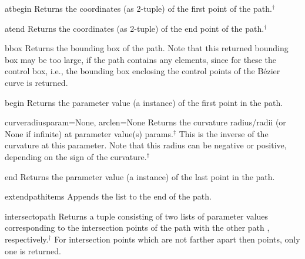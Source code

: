 \begin{methoddesc}{atbegin}{}
  Returns the coordinates (as 2-tuple) of the first point of the path.$^\dagger$
\end{methoddesc}

\begin{methoddesc}{atend}{}
  Returns the coordinates (as 2-tuple) of the end point of the path.$^\dagger$
\end{methoddesc}

\begin{methoddesc}{bbox}{}
  Returns the bounding box of the path. Note that this returned
  bounding box may be too large, if the path contains any
   elements, since for these the control box, i.e., the
  bounding box enclosing the control points of the B\'ezier curve is
  returned. 
\end{methoddesc}

\begin{methoddesc}{begin}{}
  Returns the parameter value (a  instance) of
  the first point in the path. 
\end{methoddesc}

\begin{methoddesc}{curveradius}{param=None, arclen=None}
  Returns the curvature radius/radii (or None if infinite) at parameter
  value(s) params.$^\ddagger$ This is the inverse of the curvature at
  this parameter. Note that this radius can be negative or positive,
  depending on the sign of the curvature.$^\dagger$
\end{methoddesc}

\begin{methoddesc}{end}{}
  Returns the parameter value (a  instance) of
  the last point in the path. 
\end{methoddesc}

\begin{methoddesc}{extend}{pathitems}
Appends the list  to the end of the path. 
\end{methoddesc}

\begin{methoddesc}{intersect}{opath}
  Returns a tuple consisting of two lists of parameter values
  corresponding to the intersection points of the path with the other
  path , respectively.$^\dagger$ For intersection points which
  are not farther apart then  points, only one is returned. 
\end{methoddesc}

